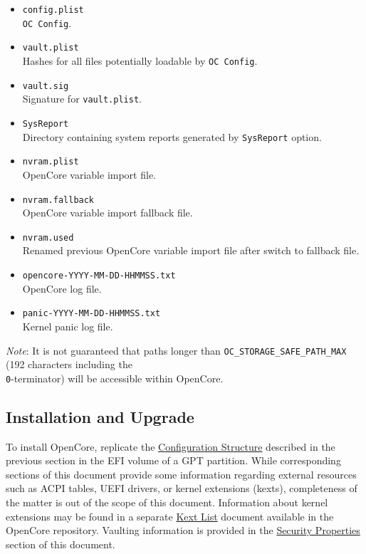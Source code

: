 \documentclass[]{article}
\begin{document}
\begin{itemize}
  directly or through a custom launcher however, other directories containing
  \texttt{OpenCore.efi} files are also supported.
\item
  \texttt{config.plist} \\
  \texttt{OC Config}.
\item
  \texttt{vault.plist} \\
  Hashes for all files potentially loadable by \texttt{OC Config}.
\item
  \texttt{vault.sig} \\
  Signature for \texttt{vault.plist}.
\item
  \texttt{SysReport} \\
  Directory containing system reports generated by \texttt{SysReport} option.
\item
  \texttt{nvram.plist} \\
  OpenCore variable import file.
\item
  \texttt{nvram.fallback} \\
  OpenCore variable import fallback file.
\item
  \texttt{nvram.used} \\
  Renamed previous OpenCore variable import file after switch to fallback file.
\item
  \texttt{opencore-YYYY-MM-DD-HHMMSS.txt} \\
  OpenCore log file.
\item
  \texttt{panic-YYYY-MM-DD-HHMMSS.txt} \\
  Kernel panic log file.
\end{itemize}

\emph{Note}: It is not guaranteed that paths longer than
\texttt{OC\_STORAGE\_SAFE\_PATH\_MAX} (192 characters including
the \texttt{\\0}-terminator) will be accessible within OpenCore.

\subsection{Installation and Upgrade}\label{configuration-install}

To install OpenCore, replicate the
\hyperref[configuration-structure]{Configuration Structure} described
in the previous section in the EFI volume of a GPT partition. While
corresponding sections of this document provide some information
regarding external resources such as ACPI tables, UEFI drivers,
or kernel extensions (kexts), completeness of the matter is out of
the scope of this document. Information about kernel extensions may
be found in a separate
\href{https://github.com/acidanthera/OpenCorePkg/blob/master/Docs/Kexts.md}{Kext List}
document available in the OpenCore repository. Vaulting information is provided in
the \hyperref[miscsecurityprops]{Security Properties} section of this document.
\end{document}
